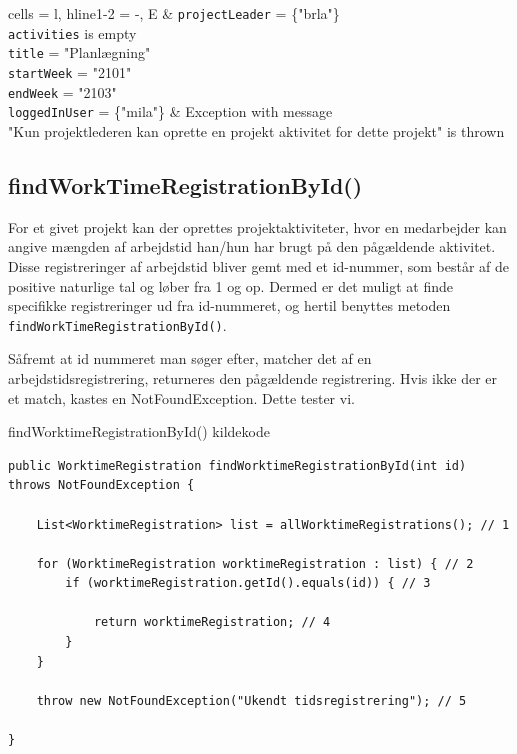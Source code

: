 \begin{table}[H]
\begin{tblr}{
  cells = {l},
  hline{1-2} = {-}{},
}
E & 
{
    \texttt{projectLeader} = \{"brla"\} \\
    \texttt{activities} is empty \\
    \texttt{title} = "Planlægning" \\
    \texttt{startWeek} = "2101" \\ 
    \texttt{endWeek} = "2103" \\
    \texttt{loggedInUser} = \{"mila"\}
} & 
{
    Exception with message \\ 
    "Kun projektlederen kan oprette en projekt aktivitet for dette projekt" is thrown
} \\

\end{tblr}
\end{table}

\subsection{findWorkTimeRegistrationById()}

For et givet projekt kan der oprettes projektaktiviteter, hvor en medarbejder kan angive mængden af arbejdstid han/hun har brugt på den pågældende aktivitet. Disse registreringer af arbejdstid bliver gemt med et id-nummer, som består af de positive naturlige tal og løber fra 1 og op. Dermed er det muligt at finde specifikke registreringer ud fra id-nummeret, og hertil benyttes metoden \texttt{findWorkTimeRegistrationById()}. 

Såfremt at id nummeret man søger efter, matcher det af en arbejdstidsregistrering, returneres den pågældende registrering. Hvis ikke der er et match, kastes en NotFoundException. Dette tester vi.

\begin{listing}[H]
    \centering
    \caption{findWorktimeRegistrationById() kildekode}\label{lst:find_work_time_registration_by_id_source_code}
    \begin{verbatim}
public WorktimeRegistration findWorktimeRegistrationById(int id) throws NotFoundException {
    
    List<WorktimeRegistration> list = allWorktimeRegistrations(); // 1

    for (WorktimeRegistration worktimeRegistration : list) { // 2
        if (worktimeRegistration.getId().equals(id)) { // 3
            
            return worktimeRegistration; // 4
        }
    }

    throw new NotFoundException("Ukendt tidsregistrering"); // 5

}
    \end{verbatim}
\end{listing}

